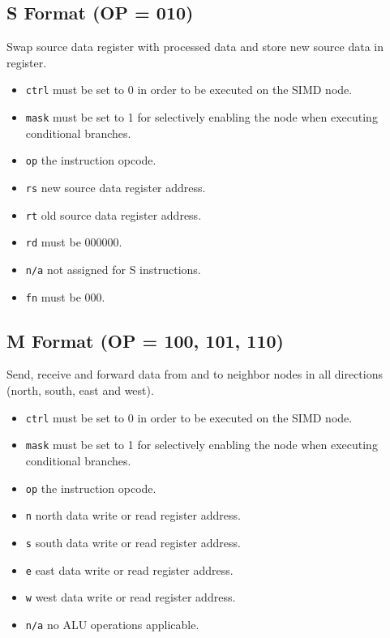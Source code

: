 

\subsection[S Format]{S Format (OP = 010)}
Swap source data register with processed data and store new source data in
register.



\begin{itemize}
\item {\tt ctrl} must be set to 0 in order to be executed on the SIMD node.
\item {\tt mask} must be set to 1 for selectively enabling the node when executing
  conditional branches.
\item {\tt op} the instruction opcode.
\item {\tt rs} new source data register address.
\item {\tt rt} old source data register address.
\item {\tt rd} must be 000000.
\item {\tt n/a} not assigned for S instructions.
\item {\tt fn} must be 000.
\end{itemize}



\subsection[M Format]{M Format (OP = 100, 101, 110)}
Send, receive and forward data from and to neighbor nodes in all directions
(north, south, east and west).



\begin{itemize}
\item {\tt ctrl} must be set to 0 in order to be executed on the SIMD node.
\item {\tt mask} must be set to 1 for selectively enabling the node when executing
  conditional branches.
\item {\tt op} the instruction opcode.
\item {\tt n} north data write or read register address.
\item {\tt s} south data write or read register address.
\item {\tt e} east data write or read register address.
\item {\tt w} west data write or read register address.
\item {\tt n/a} no ALU operations applicable.
\end{itemize}

